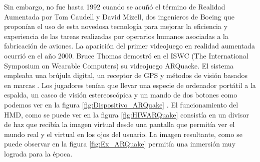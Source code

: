 Sin embargo, no fue hasta 1992 cuando se acuñó el término de Realidad Aumentada por Tom Caudell y David Mizell, dos ingenieros de Boeing que proponían el uso de esta novedosa tecnología para mejorar la eficiencia y experiencia de las tareas realizadas por operarios humanos asociadas a la fabricación de aviones.
La aparición del primer videojuego en realidad aumentada ocurrió en el año 2000. Bruce Thomas demostró en el ISWC (The International Symposium on Wearable Computers) su videojuego ARQuacke. El sistema empleaba una brújula digital, un receptor de GPS y métodos de visión basados en marcas \cite{ARToolkit}. Los jugadores tenían que llevar una especie de ordenador portátil a la espalda, un casco de visión estereoscópica y un mando de dos botones\cite{ARQuake} como podemos ver en la figura \ref{fig:Dispositivo_ARQuake} . El funcionamiento del HMD, como se puede ver en la figura \ref{fig:HIWARQuake} consistía en un divisor de haz que recibía la imagen virtual desde una pantalla que permitía ver el mundo real y el virtual en los ojos del usuario. La imagen resultante, como se puede observar en la figura \ref{fig:Ex_ARQuake} permitía una inmersión muy lograda para la época.

